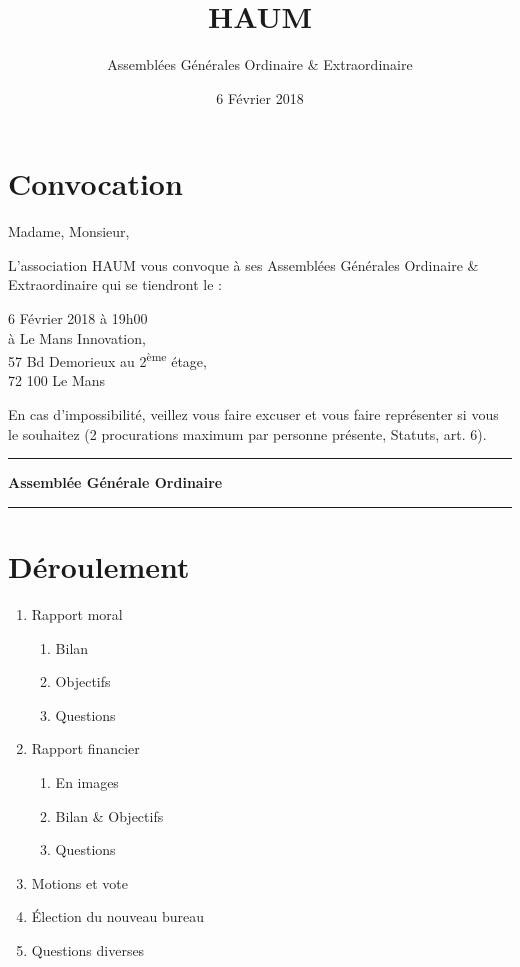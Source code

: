 \documentclass[11pt]{article}
\title{HAUM}
\author{Assemblées Générales Ordinaire \& Extraordinaire}
\date{6 Février 2018}
\begin{document}
\maketitle

\section*{Convocation}

Madame, Monsieur,

L'association HAUM vous convoque à ses Assemblées Générales Ordinaire \& Extraordinaire qui se tiendront le :

\begin{center}
{\Large 6 Février 2018 à 19h00}\\
à Le Mans Innovation, \\57 Bd Demorieux au 2\textsuperscript{ème} étage, \\72 100 Le Mans
\end{center}

En cas d'impossibilité, veillez vous faire excuser et vous faire représenter si vous le souhaitez (2 procurations maximum par personne présente, Statuts, art. 6).

\newpage

\hrule
\vspace{.6cm}
\begin{center}
\Large\bfseries Assemblée Générale Ordinaire
\end{center}
\vspace{.3cm}
\hrule

\vspace{1.5cm}

\section*{Déroulement}

\begin{enumerate}
    \item Rapport moral
        \begin{enumerate}
            \item Bilan
            \item Objectifs
            \item Questions
        \end{enumerate}
    \item Rapport financier
        \begin{enumerate}
						\item En images
            \item Bilan \& Objectifs
            \item Questions
        \end{enumerate}
    \item Motions et vote
    \item Élection du nouveau bureau
    \item Questions diverses
\end{enumerate}
\end{document}
